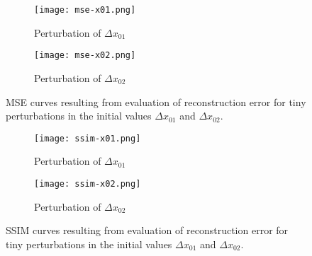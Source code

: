 \begin{figure}[htb]
	\centering
	\begin{subfigure}{0.49\textwidth}
		\centering
		\texttt{[image: mse-x01.png]}
		\caption{Perturbation of $\Delta x_{01}$}
		\label{fig:perturb-mse-x01}
	\end{subfigure} 
	\begin{subfigure}{0.49\textwidth}
		\centering
		\texttt{[image: mse-x02.png]}
		\caption{Perturbation of $\Delta x_{02}$}
		\label{fig:perturb-mse-x02}
	\end{subfigure}
	\caption{MSE curves resulting from evaluation of reconstruction error for tiny perturbations in the initial values $\Delta x_{01}$ and $\Delta x_{02}$.}
	\label{fig:perturb-mse}
\end{figure}

\begin{figure}[htb]
	\centering
	\begin{subfigure}{0.49\textwidth}
		\centering
		\texttt{[image: ssim-x01.png]}
		\caption{Perturbation of $\Delta x_{01}$}
		\label{fig:perturb-ssim-x01}
	\end{subfigure} 
	\begin{subfigure}{0.49\textwidth}
		\centering
		\texttt{[image: ssim-x02.png]}
		\caption{Perturbation of $\Delta x_{02}$}
		\label{fig:perturb-ssim-x02}
	\end{subfigure}
	\caption{SSIM curves resulting from evaluation of reconstruction error for tiny perturbations in the initial values $\Delta x_{01}$ and $\Delta x_{02}$.}
	\label{fig:perturb-ssim}
\end{figure}